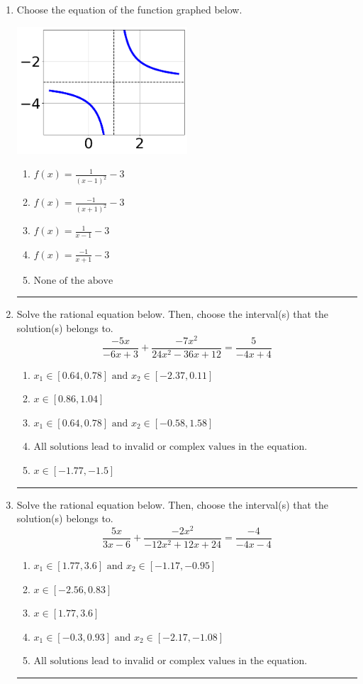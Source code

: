 \documentclass[14pt]{extbook}
\newcommand{\litem}[1]{\item#1\hspace*{-1cm}\rule{\textwidth}{0.4pt}}
\begin{document}
\begin{enumerate}
{\begin{enumerate}[label=\Alph*.]
\end{enumerate} }
\litem{
Choose the equation of the function graphed below.
\begin{center}
    \includegraphics[width=0.5\textwidth]{../Figures/rationalGraphToEquationCopyA.png}
\end{center}
\begin{enumerate}[label=\Alph*.]
\item \( f(x) = \frac{1}{(x - 1)^2} - 3 \)
\item \( f(x) = \frac{-1}{(x + 1)^2} - 3 \)
\item \( f(x) = \frac{1}{x - 1} - 3 \)
\item \( f(x) = \frac{-1}{x + 1} - 3 \)
\item \( \text{None of the above} \)

\end{enumerate} }
\litem{
Solve the rational equation below. Then, choose the interval(s) that the solution(s) belongs to.\[ \frac{-5x}{-6x + 3} + \frac{-7x^{2}}{24x^{2} -36 x + 12} = \frac{5}{-4x + 4} \]\begin{enumerate}[label=\Alph*.]
\item \( x_1 \in [0.64, 0.78] \text{ and } x_2 \in [-2.37,0.11] \)
\item \( x \in [0.86,1.04] \)
\item \( x_1 \in [0.64, 0.78] \text{ and } x_2 \in [-0.58,1.58] \)
\item \( \text{All solutions lead to invalid or complex values in the equation.} \)
\item \( x \in [-1.77,-1.5] \)

\end{enumerate} }
\litem{
Solve the rational equation below. Then, choose the interval(s) that the solution(s) belongs to.\[ \frac{5x}{3x -6} + \frac{-2x^{2}}{-12x^{2} +12 x + 24} = \frac{-4}{-4x -4} \]\begin{enumerate}[label=\Alph*.]
\item \( x_1 \in [1.77, 3.6] \text{ and } x_2 \in [-1.17,-0.95] \)
\item \( x \in [-2.56,0.83] \)
\item \( x \in [1.77,3.6] \)
\item \( x_1 \in [-0.3, 0.93] \text{ and } x_2 \in [-2.17,-1.08] \)
\item \( \text{All solutions lead to invalid or complex values in the equation.} \)


\end{enumerate}}
\end{enumerate}
\end{document}
